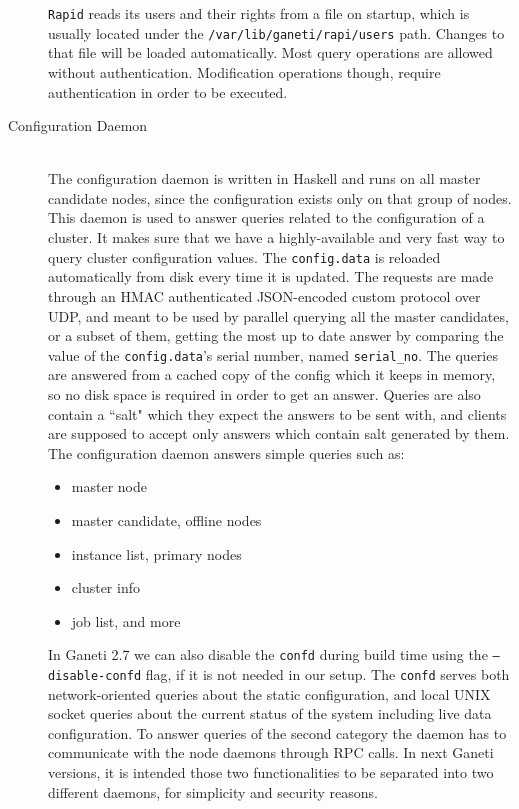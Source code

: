 \begin{description}
    \texttt{Rapid} reads its users and their rights from a file on startup,
    which is usually located under the \texttt{/var/lib/ganeti/rapi/users} path.
    Changes to that file will be loaded automatically. Most query operations
    are allowed without authentication. Modification operations though, require
    authentication in order to be executed.
  \item[Configuration Daemon] \hfill \\
    The configuration daemon is written in Haskell and runs on all master
    candidate nodes, since the configuration exists only on that group of nodes.
    This daemon is used to answer queries related to the configuration of a
    cluster. It makes sure that we have a highly-available and very fast way to
    query cluster configuration values. The \texttt{config.data} is reloaded
    automatically from disk every time it is updated. The requests are made
    through an HMAC authenticated JSON-encoded custom protocol over UDP, and
    meant to be used by parallel querying all the master candidates, or a
    subset of them, getting the most up to date answer by comparing the
    value of the \texttt{config.data}'s serial number, named \texttt{serial\_no}.
    The queries are answered from a cached copy of the config which it keeps in
    memory, so no disk space is required in order to get an answer. Queries are
    also contain a ``salt" which they expect the answers to be sent with, and
    clients are supposed to accept only answers which contain salt generated by
    them. The configuration daemon answers simple queries such as:

    \begin{itemize}
      \item master node
      \item master candidate, offline nodes
      \item instance list, primary nodes
      \item cluster info
      \item job list, and more
    \end{itemize}

    In Ganeti 2.7 we can also disable the \texttt{confd} during build time
    using the \texttt{--disable-confd} flag, if it is not needed in our setup.
    The \texttt{confd} serves both network-oriented queries about the static
    configuration, and local UNIX socket queries about the current status of the
    system including live data configuration. To answer queries of the second
    category the daemon has to communicate with the node daemons through RPC
    calls. In next Ganeti versions, it is intended those two functionalities to
    be separated into two different daemons, for simplicity and security
    reasons.
\end{description}


